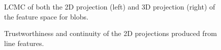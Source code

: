 \begin{figure}[H]
	\centering
	\caption{LCMC of both the 2D projection (left) and 3D projection (right) of the feature space for blobs.}\label{fig:LCMC_blobs}
\end{figure}

\clearpage
\begin{figure}[H]
	\centering
	\caption{Trustworthiness and continuity of the 2D projections produced from line features.}\label{fig:TC_2d_blobs}
\end{figure}

